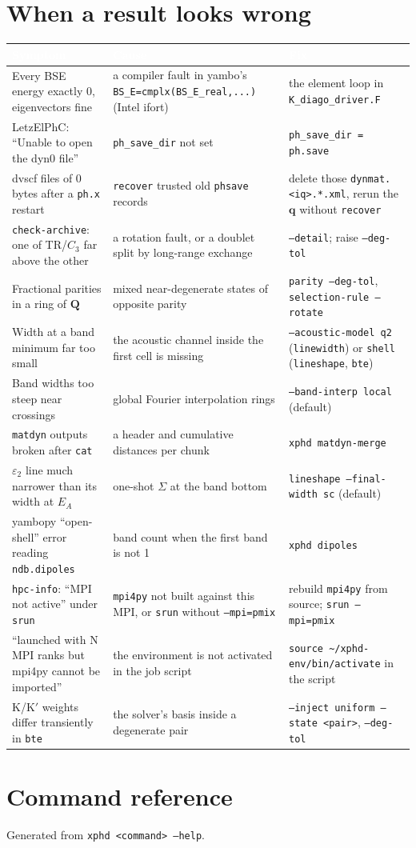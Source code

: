 \documentclass[10pt,a4paper]{article}
\newcommand{\hd}[1]{\textcolor{white}{\normalfont\bfseries #1}}
\newcommand{\hdrow}{\rowcolor{accent}}
\newcommand{\bQ}{\mathbf{Q}}
\newcommand{\bq}{\mathbf{q}}
\begin{document}
\section{When a result looks wrong}
{\small\renewcommand{\arraystretch}{1.2}
\begin{longtable}{>{\raggedright\arraybackslash}p{4.6cm}>{\raggedright\arraybackslash}p{5.0cm}>{\raggedright\arraybackslash}p{6.6cm}}
\hdrow \hd{Symptom} & \hd{Cause} & \hd{Fix}\\
\endhead
Every BSE energy exactly 0, eigenvectors fine & a compiler fault in yambo's \texttt{BS\_E=cmplx(BS\_E\_real,...)} (Intel ifort) & the element loop in \texttt{K\_diago\_driver.F}\\
LetzElPhC: ``Unable to open the dyn0 file'' & \texttt{ph\_save\_dir} not set & \texttt{ph\_save\_dir = ph.save}\\
dvscf files of 0 bytes after a \texttt{ph.x} restart & \texttt{recover} trusted old \texttt{phsave} records & delete those \texttt{dynmat.<iq>.*.xml}, rerun the $\bq$ without \texttt{recover}\\
\texttt{check-archive}: one of TR/$C_3$ far above the other & a rotation fault, or a doublet split by long-range exchange & \texttt{--detail}; raise \texttt{--deg-tol}\\
Fractional parities in a ring of $\bQ$ & mixed near-degenerate states of opposite parity & \texttt{parity --deg-tol}, \texttt{selection-rule --rotate}\\
Width at a band minimum far too small & the acoustic channel inside the first cell is missing & \texttt{--acoustic-model q2} (\texttt{linewidth}) or \texttt{shell} (\texttt{lineshape}, \texttt{bte})\\
Band widths too steep near crossings & global Fourier interpolation rings & \texttt{--band-interp local} (default)\\
\texttt{matdyn} outputs broken after \texttt{cat} & a header and cumulative distances per chunk & \texttt{xphd matdyn-merge}\\
$\varepsilon_2$ line much narrower than its width at $E_A$ & one-shot $\Sigma$ at the band bottom & \texttt{lineshape --final-width sc} (default)\\
yambopy ``open-shell'' error reading \texttt{ndb.dipoles} & band count when the first band is not 1 & \texttt{xphd dipoles}\\
\texttt{hpc-info}: ``MPI not active'' under \texttt{srun} & \texttt{mpi4py} not built against this MPI, or \texttt{srun} without \texttt{--mpi=pmix} & rebuild \texttt{mpi4py} from source; \texttt{srun --mpi=pmix}\\
``launched with N MPI ranks but mpi4py cannot be imported'' & the environment is not activated in the job script & \texttt{source \textasciitilde/xphd-env/bin/activate} in the script\\
K/K$'$ weights differ transiently in \texttt{bte} & the solver's basis inside a degenerate pair & \texttt{--inject uniform --state <pair>}, \texttt{--deg-tol}\\
\end{longtable}}

\iffull

\fi

\appendix
\section{Command reference}
Generated from \texttt{xphd <command> --help}.

\end{document}
